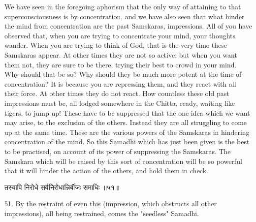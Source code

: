 We have seen in the foregoing aphorism that the only way of
attaining to that superconsciousness is by concentration, and we have
also seen that what hinder the mind from concentration are the past
Samskaras, impressions. All of you have observed that, when you are
trying to concentrate your mind, your thoughts wander. When you are
trying to think of God, that is the very time these Samskaras appear.
At other times they are not so active; but when you want them not, they
are sure to be there, trying their best to crowd in your mind. Why
should that be so? Why should they be much more potent at the time of
concentration? It is because you are repressing them, and they react
with all their force. At other times they do not react. How countless
these old past impressions must be, all lodged somewhere in the Chitta,
ready, waiting like tigers, to jump up! These have to be suppressed
that the one idea which we want may arise, to the exclusion of the
others. Instead they are all struggling to come up at the same time.
These are the various powers of the Samskaras in hindering
concentration of the mind. So this Samadhi which has just been given is
the best to be practised, on account of its power of suppressing the
Samskaras. The Samskara which will be raised by this sort of
concentration will be so powerful that it will hinder the action of the
others, and hold them in check. \\

\begin{center}
\begin{sanskrit}
तस्यापि निरोधे सर्वनिरोधान्निर्बीजः समाधिः
॥५१॥
\end{sanskrit}
\end{center}
51. By the restraint of even this (impression, which obstructs
all other impressions), all being restrained, comes the "seedless"
Samadhi. \\

